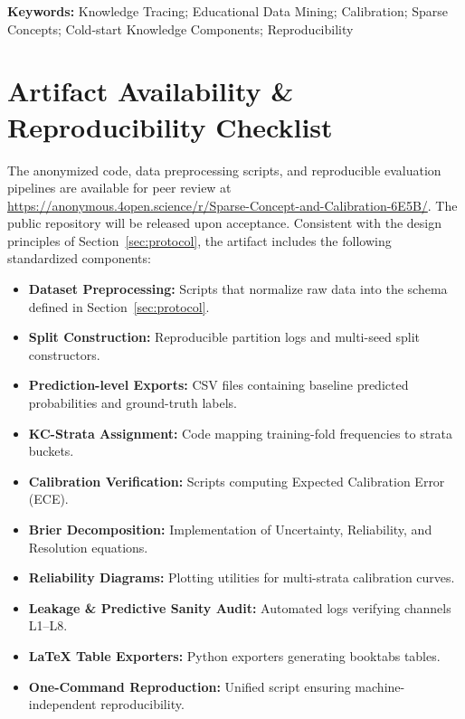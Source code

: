 \documentclass[12pt,a4paper]{jedm}
\begin{document}
\vspace{10pt}
\noindent\textbf{Keywords:} Knowledge Tracing; Educational Data Mining; Calibration; Sparse Concepts; Cold-start Knowledge Components; Reproducibility








\section*{Artifact Availability \& Reproducibility Checklist}
\begin{sloppypar}
The anonymized code, data preprocessing scripts, and reproducible evaluation pipelines are available for peer review at \url{https://anonymous.4open.science/r/Sparse-Concept-and-Calibration-6E5B/}. The public repository will be released upon acceptance. Consistent with the design principles of Section~\ref{sec:protocol}, the artifact includes the following standardized components:
\end{sloppypar}
\begin{itemize}
  \item \textbf{Dataset Preprocessing:} Scripts that normalize raw data into the schema defined in Section~\ref{sec:protocol}.
  \item \textbf{Split Construction:} Reproducible partition logs and multi-seed split constructors.
  \item \textbf{Prediction-level Exports:} CSV files containing baseline predicted probabilities and ground-truth labels.
  \item \textbf{KC-Strata Assignment:} Code mapping training-fold frequencies to strata buckets.
  \item \textbf{Calibration Verification:} Scripts computing Expected Calibration Error (ECE).
  \item \textbf{Brier Decomposition:} Implementation of Uncertainty, Reliability, and Resolution equations.
  \item \textbf{Reliability Diagrams:} Plotting utilities for multi-strata calibration curves.
  \item \textbf{Leakage \& Predictive Sanity Audit:} Automated logs verifying channels L1--L8.
  \item \textbf{LaTeX Table Exporters:} Python exporters generating booktabs tables.
  \item \textbf{One-Command Reproduction:} Unified script ensuring machine-independent reproducibility.
\end{itemize}
\end{document}
